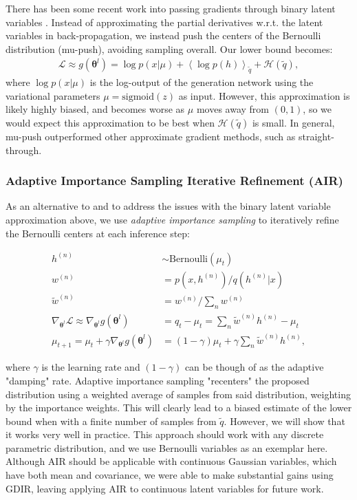 \documentclass{article} %
\newcommand{\qexp}[1]{\left<#1\right>}
\newcommand{\vects}[1]{\boldsymbol{#1}}
\newcommand{\TT}[0]{\vects{\theta}}
\newcommand{\grad}[0]{\nabla}
\newcommand{\LL}[0]{\mathcal{L}}
\newcommand{\HH}[0]{\mathcal{H}}
\newcommand{\sigmoid}{\text{sigmoid}}
\newcommand{\Bernoulli}{\text{Bernoulli}}
\begin{document}
There has been some recent work into passing gradients through binary latent
variables \citep{bengio2013estimating}. Instead of approximating the partial
derivatives w.r.t. the latent variables in back-propagation, we instead push the
centers of the Bernoulli distribution (mu-push), avoiding sampling overall. Our lower
bound becomes:
\begin{align}
     \LL \approx g(\TT^l) = \log p(x | \mu) + \qexp{\log p(h)}_{\tilde{q}} +
     \HH(\tilde{q}),
\end{align}
where $\log p(x | \mu)$ is the log-output of the generation network using the
variational parameters $\mu = \sigmoid(z)$ as input. However, this approximation
is likely highly biased, and becomes worse as $\mu$ moves away from $(0, 1)$, so
we would expect this approximation to be best when $\HH(\tilde{q})$ is small. In general, mu-push outperformed other approximate gradient methods, such as straight-through.

\subsubsection{Adaptive Importance Sampling Iterative Refinement (AIR)}
As an alternative to and to address the issues with the binary latent variable approximation above, we use \emph{adaptive importance sampling} \citep[AdIS,][]{oh1992adaptive} to iteratively refine the Bernoulli centers at each inference step:

\begin{align}
    h^{(n)} &\sim \Bernoulli(\mu_t) \nonumber \\
w^{(n)} &= p(x, h^{(n)}) / q(h^{(n)} | x) \nonumber \\
\tilde{w}^{(n)} &= w^{(n)} / \sum_n w^{(n)} \nonumber \\
\grad_{\TT^l} \LL \approx \grad_{\TT^l} g(\TT^l) &= q_t - \mu_t  = \sum_n \tilde{w}^{(n)} h^{(n)} - \mu_t  \nonumber\\
\mu_{t+1} = \mu_t + \gamma \grad_{\TT^l} g(\TT^l) &= (1 - \gamma) \mu_t + \gamma \sum_n \tilde{w}^{(n)} h^{(n)},
\end{align}

where $\gamma$ is the learning rate and $(1 - \gamma)$ can be though of as the adaptive "damping" rate. Adaptive importance sampling "recenters" the proposed distribution using a weighted average of samples from said distribution, weighting by the importance weights. This will clearly lead to a biased estimate of the lower bound when with a finite number of samples from $\tilde{q}$. However, we will show that it works very well in practice. This approach should work with any discrete parametric distribution, and we use Bernoulli variables as an exemplar here. Although AIR should be applicable with continuous Gaussian variables, which have both mean and covariance, we were able to make substantial gains using GDIR, leaving applying AIR to continuous latent variables for future work.
\end{document}
